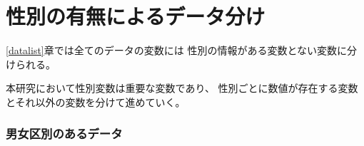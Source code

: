%
%



\chapter{性別の有無によるデータ分け}


\ref{datalist}章では全てのデータの変数には
性別の情報がある変数とない変数に分けられる。


本研究において性別変数は重要な変数であり、
性別ごとに数値が存在する変数とそれ以外の変数を分けて進めていく。

\subsection{男女区別のあるデータ}

